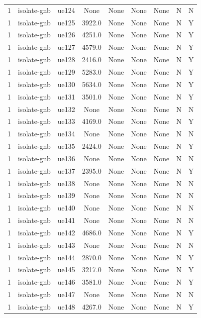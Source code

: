 \begin{table}[ht]
\begin{tabular}{|c|c|c|c|c|c|c|c|c|}
1 & isolate-gnb & ue124 & None & None & None & None & N & N \\
1 & isolate-gnb & ue125 & 3922.0 & None & None & None & N & Y \\
1 & isolate-gnb & ue126 & 4251.0 & None & None & None & N & Y \\
1 & isolate-gnb & ue127 & 4579.0 & None & None & None & N & Y \\
1 & isolate-gnb & ue128 & 2416.0 & None & None & None & N & Y \\
1 & isolate-gnb & ue129 & 5283.0 & None & None & None & N & Y \\
1 & isolate-gnb & ue130 & 5634.0 & None & None & None & N & Y \\
1 & isolate-gnb & ue131 & 3501.0 & None & None & None & N & Y \\
1 & isolate-gnb & ue132 & None & None & None & None & N & N \\
1 & isolate-gnb & ue133 & 4169.0 & None & None & None & N & Y \\
1 & isolate-gnb & ue134 & None & None & None & None & N & N \\
1 & isolate-gnb & ue135 & 2424.0 & None & None & None & N & Y \\
1 & isolate-gnb & ue136 & None & None & None & None & N & N \\
1 & isolate-gnb & ue137 & 2395.0 & None & None & None & N & Y \\
1 & isolate-gnb & ue138 & None & None & None & None & N & N \\
1 & isolate-gnb & ue139 & None & None & None & None & N & N \\
1 & isolate-gnb & ue140 & None & None & None & None & N & N \\
1 & isolate-gnb & ue141 & None & None & None & None & N & N \\
1 & isolate-gnb & ue142 & 4686.0 & None & None & None & N & Y \\
1 & isolate-gnb & ue143 & None & None & None & None & N & N \\
1 & isolate-gnb & ue144 & 2870.0 & None & None & None & N & Y \\
1 & isolate-gnb & ue145 & 3217.0 & None & None & None & N & Y \\
1 & isolate-gnb & ue146 & 3581.0 & None & None & None & N & Y \\
1 & isolate-gnb & ue147 & None & None & None & None & N & N \\
1 & isolate-gnb & ue148 & 4267.0 & None & None & None & N & Y \\

\end{tabular}
\end{table}
